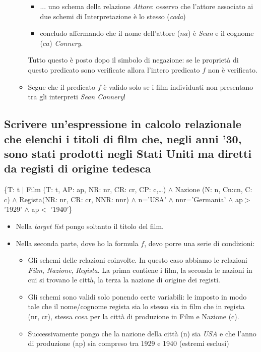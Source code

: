 \begin{itemize}
\begin{itemize}
\begin{itemize}
			\item ... uno schema della relazione \emph{Attore}: osservo che l'attore associato ai due schemi di Interpretazione è lo stesso (\emph{coda})
			\item concludo affermando che il nome dell'attore ($na$) è \emph{Sean} e il cognome ($ca$) \emph{Connery}.
		\end{itemize}
		Tutto questo è posto dopo il simbolo di negazione: se le proprietà di questo predicato sono verificate allora l'intero predicato $f$ non è verificato. 
		\item Segue che il predicato $f$ è valido solo se i film individuati non presentano tra gli interpreti \emph{Sean Connery}!
	\end{itemize}
\end{itemize}

\subsection*{Scrivere un’espressione in calcolo relazionale che elenchi i titoli di film che, negli anni ’30, sono stati prodotti negli Stati Uniti ma diretti da registi di origine tedesca}
\{T: t $|$ Film (T: t, AP: ap, NR: nr, CR: cr, CP: c,\dots) $\land$ Nazione (N: n, Cn:cn, C: c) $\land$ Regista(NR: nr,
CR: cr, NNR: nnr) $\land$ n=’USA’ $\land$ nnr=’Germania’ $\land$ ap$>$’1929’ $\land$ ap$<$ ’1940’\}
\begin{itemize}
	\item Nella \emph{target list} pongo soltanto il titolo del film. 
	\item Nella seconda parte, dove ho la formula $f$, devo porre una serie di condizioni:
	\begin{itemize}
		\item Gli schemi delle relazioni coinvolte. In questo caso abbiamo le relazioni \emph{Film}, \emph{Nazione}, \emph{Regista}. La prima contiene i film, la seconda le nazioni in cui si trovano le città, la terza la nazione di origine dei registi.
		\item Gli schemi sono validi solo ponendo certe variabili: le imposto in modo tale che il nome/cognome regista sia lo stesso sia in film che in regista (nr, cr), stessa cosa per la città di produzione in Film e Nazione (c).
		\item Successivamente pongo che la nazione della città (n) sia \emph{USA} e che l'anno di produzione (ap) sia compreso tra 1929 e 1940 (estremi esclusi)
	\end{itemize}
\end{itemize}